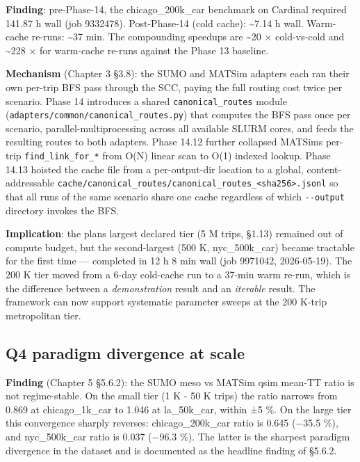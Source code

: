 \textbf{Finding}: pre-Phase-14, the chicago\_200k\_car benchmark on
Cardinal required 141.87 h wall (job 9332478). Post-Phase-14 (cold
cache): \textasciitilde7.14 h wall. Warm-cache re-runs:
\textasciitilde37 min. The compounding speedups are \textasciitilde20 ×
cold-vs-cold and \textasciitilde228 × for warm-cache re-runs against the
Phase 13 baseline.

\textbf{Mechanism} (Chapter 3 §3.8): the SUMO and MATSim adapters each
ran their own per-trip BFS pass through the SCC, paying the full routing
cost twice per scenario. Phase 14 introduces a shared
\texttt{canonical\_routes} module
(\texttt{adapters/common/canonical\_routes.py}) that computes the BFS
pass once per scenario, parallel-multiprocessing across all available
SLURM cores, and feeds the resulting routes to both adapters. Phase
14.12 further collapsed MATSim\textquotesingle s per-trip
\texttt{find\_link\_for\_*} from O(N) linear scan to O(1) indexed
lookup. Phase 14.13 hoisted the cache file from a per-output-dir
location to a global, content-addressable
\texttt{cache/canonical\_routes/canonical\_routes\_\textless{}sha256\textgreater{}.jsonl}
so that all runs of the same scenario share one cache regardless of
which \texttt{-\/-output} directory invokes the BFS.

\textbf{Implication}: the plan\textquotesingle s largest declared
tier (5 M trips, §1.13) remained out of compute budget, but the
second-largest (500 K, nyc\_500k\_car) became tractable for the first
time --- completed in 12 h 8 min wall (job 9971042, 2026-05-19). The 200
K tier moved from a 6-day cold-cache run to a 37-min warm re-run, which
is the difference between a \emph{demonstration} result and an
\emph{iterable} result. The framework can now support systematic
parameter sweeps at the 200 K-trip metropolitan tier.

\subsection{Q4 paradigm divergence at
scale}\label{622-q4-paradigm-divergence-at-scale}

\textbf{Finding} (Chapter 5 §5.6.2): the SUMO meso vs MATSim qsim
mean-TT ratio is not regime-stable. On the small tier (1 K - 50 K trips)
the ratio narrows from 0.869 at chicago\_1k\_car to 1.046 at
la\_50k\_car, within ±5 \%. On the large tier this convergence sharply
reverses: chicago\_200k\_car ratio is 0.645 (−35.5 \%), and
nyc\_500k\_car ratio is 0.037 (−96.3 \%). The latter is the sharpest
paradigm divergence in the dataset and is documented as the headline
finding of §5.6.2.

